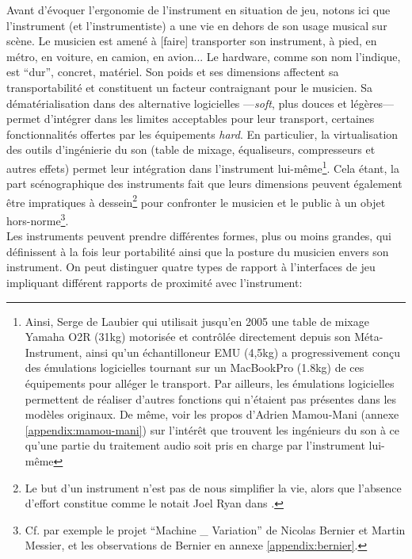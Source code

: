 \noindent Avant d'évoquer l'ergonomie de l'instrument en situation de jeu, notons ici que l'instrument (et l'instrumentiste) a une vie en dehors de son usage musical sur scène. Le musicien est amené à [faire] transporter son instrument, à pied, en métro, en voiture, en camion, en avion... Le hardware, comme son nom l'indique, est ``dur'', concret, matériel. Son poids et ses dimensions affectent sa transportabilité et constituent un facteur contraignant pour le musicien. Sa dématérialisation dans des alternative logicielles —\textit{soft}, plus douces et légères— permet d'intégrer dans les limites acceptables pour leur transport, certaines fonctionnalités offertes par les équipements \textit{hard}. En particulier, la virtualisation des outils d'ingénierie du son (table de mixage, équaliseurs, compresseurs et autres effets) permet leur intégration dans l'instrument lui-même\footnote{Ainsi, Serge de Laubier qui utilisait jusqu'en 2005 une table de mixage Yamaha O2R (31kg) motorisée et contrôlée directement depuis son Méta-Instrument, ainsi qu'un échantilloneur EMU (4,5kg) a progressivement conçu des émulations logicielles tournant sur un MacBookPro (1.8kg) de ces équipements pour alléger le transport. Par ailleurs, les émulations logicielles permettent de réaliser d'autres fonctions qui n'étaient pas présentes dans les modèles originaux. De même, voir les propos d'Adrien Mamou-Mani (annexe \ref{appendix:mamou-mani}) sur l'intérêt que trouvent les ingénieurs du son à ce qu'une partie du traitement audio soit pris en charge par l'instrument lui-même}. Cela étant, la part scénographique des instruments fait que leurs dimensions peuvent également être impratiques à dessein\footnote{Le but d'un instrument n'est pas de nous simplifier la vie, alors que l'absence d'effort constitue  comme le notait Joel Ryan dans \cite{ryan_remarks_1991}.} pour confronter le musicien et le public à un objet hors-norme\footnote{Cf. par exemple le projet ``Machine \_ Variation'' de Nicolas Bernier et Martin Messier, et les observations de Bernier en annexe \ref{appendix:bernier}.}.\\
\indent Les instruments peuvent prendre différentes formes, plus ou moins grandes, qui définissent à la fois leur portabilité ainsi que la posture du musicien envers son instrument. On peut distinguer quatre types de rapport à l'interfaces de jeu impliquant différent rapports de proximité avec l'instrument:
\vspace{-1em}
